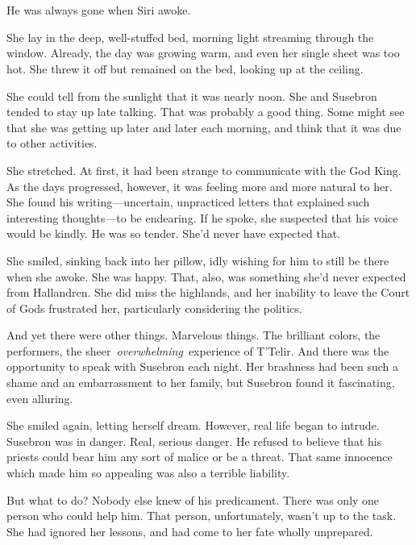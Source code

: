 \chapter{}

He was always gone when Siri awoke.

She lay in the deep, well-stuffed bed, morning light streaming through the window. Already, the day was growing warm, and even her single sheet was too hot. She threw it off but remained on the bed, looking up at the ceiling.

She could tell from the sunlight that it was nearly noon. She and Susebron tended to stay up late talking. That was probably a good thing. Some might see that she was getting up later and later each morning, and think that it was due to other activities.

She stretched. At first, it had been strange to communicate with the God King. As the days progressed, however, it was feeling more and more natural to her. She found his writing—uncertain, unpracticed letters that explained such interesting thoughts—to be endearing. If he spoke, she suspected that his voice would be kindly. He was so tender. She’d never have expected that.

She smiled, sinking back into her pillow, idly wishing for him to still be there when she awoke. She was happy. That, also, was something she’d never expected from Hallandren. She did miss the highlands, and her inability to leave the Court of Gods frustrated her, particularly considering the politics.

And yet there were other things. Marvelous things. The brilliant colors, the performers, the sheer~\textit{overwhelming}~experience of T’Telir. And there was the opportunity to speak with Susebron each night. Her brashness had been such a shame and an embarrassment to her family, but Susebron found it fascinating, even alluring.

She smiled again, letting herself dream. However, real life began to intrude. Susebron was in danger. Real, serious danger. He refused to believe that his priests could bear him any sort of malice or be a threat. That same innocence which made him so appealing was also a terrible liability.

But what to do? Nobody else knew of his predicament. There was only one person who could help him. That person, unfortunately, wasn’t up to the task. She had ignored her lessons, and had come to her fate wholly unprepared.

